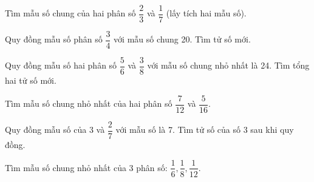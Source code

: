 \begin{ex} %
Tìm mẫu số chung của hai phân số $\dfrac{2}{3}$ và $\dfrac{1}{7}$ (lấy tích hai mẫu số).
\end{ex}

\begin{ex} %
Quy đồng mẫu số phân số $\dfrac{3}{4}$ với mẫu số chung 20. Tìm tử số mới.
\end{ex}

\begin{ex} %
Quy đồng mẫu số hai phân số $\dfrac{5}{6}$ và $\dfrac{3}{8}$ với mẫu số chung nhỏ nhất là 24. Tìm tổng hai tử số mới.
\end{ex}

\begin{ex} %
Tìm mẫu số chung nhỏ nhất của hai phân số $\dfrac{7}{12}$ và $\dfrac{5}{16}$.
\end{ex}

\begin{ex} %
Quy đồng mẫu số của 3 và $\dfrac{2}{7}$ với mẫu số là 7. Tìm tử số của số 3 sau khi quy đồng.
\end{ex}

\begin{ex} %
Tìm mẫu số chung nhỏ nhất của 3 phân số: $\dfrac{1}{6}, \dfrac{1}{8}, \dfrac{1}{12}$.
\end{ex}
